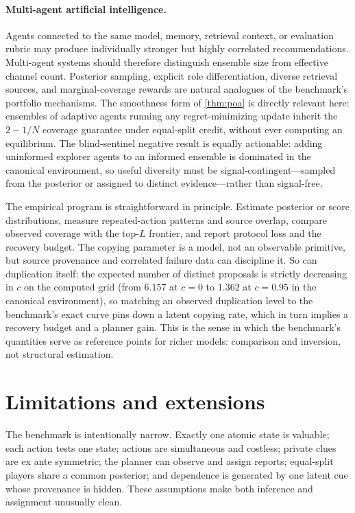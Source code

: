 \documentclass[11pt]{article}
\theoremstyle{definition}
\theoremstyle{remark}
\newcommand{\1}{\mathbf{1}}
\begin{document}
\paragraph{Multi-agent artificial intelligence.}
Agents connected to the same model, memory, retrieval context, or evaluation rubric may produce individually stronger but highly correlated recommendations. Multi-agent systems should therefore distinguish ensemble size from effective channel count. Posterior sampling, explicit role differentiation, diverse retrieval sources, and marginal-coverage rewards are natural analogues of the benchmark's portfolio mechanisms. The smoothness form of \cref{thm:poa} is directly relevant here: ensembles of adaptive agents running any regret-minimizing update inherit the $2-1/N$ coverage guarantee under equal-split credit, without ever computing an equilibrium. The blind-sentinel negative result is equally actionable: adding uninformed explorer agents to an informed ensemble is dominated in the canonical environment, so useful diversity must be signal-contingent---sampled from the posterior or assigned to distinct evidence---rather than signal-free.

The empirical program is straightforward in principle. Estimate posterior or score distributions, measure repeated-action patterns and source overlap, compare observed coverage with the top-$L$ frontier, and report protocol loss and the recovery budget. The copying parameter is a model, not an observable primitive, but source provenance and correlated failure data can discipline it. So can duplication itself: the expected number of distinct proposals is strictly decreasing in $c$ on the computed grid (from $6.157$ at $c=0$ to $1.362$ at $c=0.95$ in the canonical environment), so matching an observed duplication level to the benchmark's exact curve pins down a latent copying rate, which in turn implies a recovery budget and a planner gain. This is the sense in which the benchmark's quantities serve as reference points for richer models: comparison and inversion, not structural estimation.

\section{Limitations and extensions}
\label{sec:limitations}

The benchmark is intentionally narrow. Exactly one atomic state is valuable; each action tests one state; actions are simultaneous and costless; private clues are ex ante symmetric; the planner can observe and assign reports; equal-split players share a common posterior; and dependence is generated by one latent cue whose provenance is hidden. These assumptions make both inference and assignment unusually clean.
\end{document}
